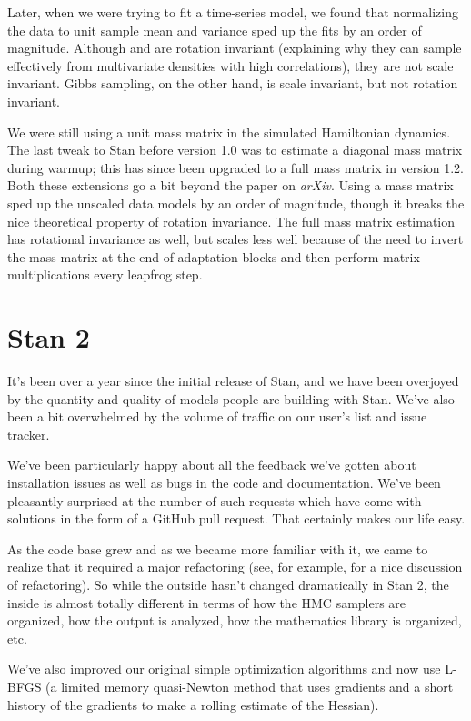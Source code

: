 Later, when we were trying to fit a time-series model, we found that
normalizing the data to unit sample mean and variance sped up the fits
by an order of magnitude.  Although \HMC and \NUTS are rotation
invariant (explaining why they can sample effectively from
multivariate densities with high correlations), they are not scale
invariant.  Gibbs sampling, on the other hand, is scale invariant, but
not rotation invariant.

We were still using a unit mass matrix in the simulated Hamiltonian
dynamics.  The last tweak to Stan before version 1.0 was to estimate
a diagonal mass matrix during warmup; this has since been upgraded to
a full mass matrix in version 1.2.  Both these extensions go a bit
beyond the \NUTS paper on {\it arXiv}.  Using a mass matrix sped up
the unscaled data models by an order of magnitude, though it breaks
the nice theoretical property of rotation invariance.  The full mass
matrix estimation has rotational invariance as well, but scales less
well because of the need to invert the mass matrix at the end of
adaptation blocks and then perform matrix multiplications every
leapfrog step.

\section*{Stan 2}

It's been over a year since the initial release of Stan, and we have
been overjoyed by the quantity and quality of models people are
building with Stan.  We've also been a bit overwhelmed by the volume
of traffic on our user's list and issue tracker.

We've been particularly happy about all the feedback we've gotten
about installation issues as well as bugs in the code and
documentation.  We've been pleasantly surprised at the number of such
requests which have come with solutions in the form of a GitHub pull
request.  That certainly makes our life easy.

As the code base grew and as we became more familiar with it, we came
to realize that it required a major refactoring (see, for example,
\citep{FowlerEtAl:1999} for a nice discussion of refactoring).  So
while the outside hasn't changed dramatically in Stan 2, the inside is
almost totally different in terms of how the HMC samplers are
organized, how the output is analyzed, how the mathematics library is
organized, etc.  

We've also improved our original simple optimization algorithms and
now use L-BFGS (a limited memory quasi-Newton method that uses
gradients and a short history of the gradients to make a rolling
estimate of the Hessian).


